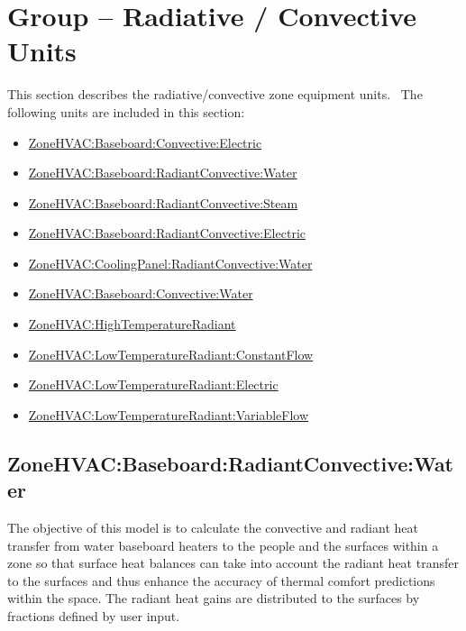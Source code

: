 
\section{Group -- Radiative \textbf{/} Convective Units}\label{group-radiative-convective-units}

This section describes the radiative/convective zone equipment units.~ The following units are included in this section:

\begin{itemize}
\item
  \hyperref[zonehvacbaseboardconvectiveelectric]{ZoneHVAC:Baseboard:Convective:Electric}
\item
  \hyperref[zonehvacbaseboardradiantconvectivewater]{ZoneHVAC:Baseboard:RadiantConvective:Water}
\item
  \hyperref[zonehvacbaseboardradiantconvectivesteam]{ZoneHVAC:Baseboard:RadiantConvective:Steam}
\item
  \hyperref[zonehvacbaseboardradiantconvectiveelectric]{ZoneHVAC:Baseboard:RadiantConvective:Electric}
\item
  \hyperref[zonehvaccoolingpanelradiantconvectivewater]{ZoneHVAC:CoolingPanel:RadiantConvective:Water}
\item
  \hyperref[zonehvacbaseboardconvectivewater]{ZoneHVAC:Baseboard:Convective:Water}
\item
  \hyperref[zonehvachightemperatureradiant]{ZoneHVAC:HighTemperatureRadiant}
\item
  \hyperref[zonehvaclowtemperatureradiantconstantflow]{ZoneHVAC:LowTemperatureRadiant:ConstantFlow}
\item
  \hyperref[zonehvaclowtemperatureradiantelectric]{ZoneHVAC:LowTemperatureRadiant:Electric}
\item
  \hyperref[zonehvaclowtemperatureradiantvariableflow]{ZoneHVAC:LowTemperatureRadiant:VariableFlow}
\end{itemize}

\subsection{ZoneHVAC:Baseboard:RadiantConvective:Water}\label{zonehvacbaseboardradiantconvectivewater}

The objective of this model is to calculate the convective and radiant heat transfer from water baseboard heaters to the people and the surfaces within a zone so that surface heat balances can take into account the radiant heat transfer to the surfaces and thus enhance the accuracy of thermal comfort predictions within the space. The radiant heat gains are distributed to the surfaces by fractions defined by user input.

